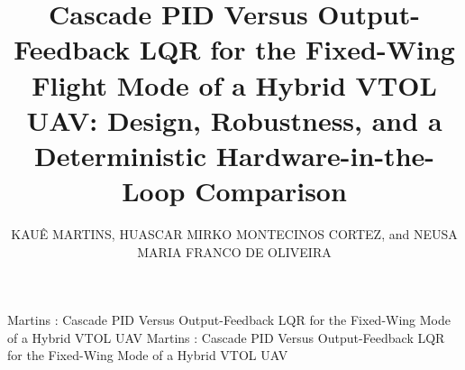 \documentclass{ieeeaccess}
\newcommand{\pendente}[1]{\textcolor{red}{\textbf{[PENDENTE: #1]}}}
\begin{document}
\doi{}

\title{Cascade PID Versus Output-Feedback LQR for the Fixed-Wing Flight
Mode of a Hybrid VTOL UAV: Design, Robustness, and a Deterministic
Hardware-in-the-Loop Comparison}

\author{\uppercase{Kau\^e Martins},
\uppercase{Huascar Mirko Montecinos Cortez},
and \uppercase{Neusa Maria Franco de Oliveira}}
\address[1]{Instituto Tecnol\'ogico de Aeron\'autica (ITA), S\~ao Jos\'e dos
Campos, SP, Brazil (e-mail: kaue.martins124@gmail.com)}

\markboth
{Martins \headeretal: Cascade PID Versus Output-Feedback LQR for the Fixed-Wing Mode of a Hybrid VTOL UAV}
{Martins \headeretal: Cascade PID Versus Output-Feedback LQR for the Fixed-Wing Mode of a Hybrid VTOL UAV}

\end{document}
